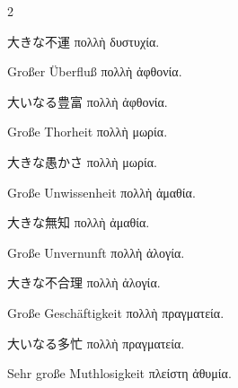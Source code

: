 \begin{paracol}{2}
\begin{enumerate}[leftmargin=0pt,rightmargin=0pt,listparindent =1cm,labelindent=1cm,labelsep=1ex,labelwidth={*},itemindent={*},align=left]
\begin{continuousitemline}
\begin{japanese}
大きな不運 \textgreek[variant=ancient]{πολλὴ δυστυχία.}
\end{japanese}
\switchcolumn*

\begin{german}
Großer Überfluß \textgreek[variant=ancient]{πολλὴ ἀφθονία.}
\end{german}
\switchcolumn

\begin{japanese}
大いなる豊富 \textgreek[variant=ancient]{πολλὴ ἀφθονία.}
\end{japanese}
\switchcolumn*

\begin{german}
Große Thorheit \textgreek[variant=ancient]{πολλὴ μωρία.}
\end{german}
\switchcolumn

\begin{japanese}
大きな愚かさ \textgreek[variant=ancient]{πολλὴ μωρία.}
\end{japanese}
\switchcolumn*

\begin{german}
Große Unwissenheit \textgreek[variant=ancient]{πολλὴ ἀμαθία.}
\end{german}
\switchcolumn

\begin{japanese}
大きな無知 \textgreek[variant=ancient]{πολλὴ ἀμαθία.}
\end{japanese}
\switchcolumn*

\begin{german}
Große Unvernunft \textgreek[variant=ancient]{πολλὴ ἀλογία.}
\end{german}
\switchcolumn

\begin{japanese}
大きな不合理 \textgreek[variant=ancient]{πολλὴ ἀλογία.}
\end{japanese}
\switchcolumn*

\begin{german}
Große Geschäftigkeit \textgreek[variant=ancient]{πολλὴ πραγματεία.}
\end{german}
\switchcolumn

\begin{japanese}
大いなる多忙 \textgreek[variant=ancient]{πολλὴ πραγματεία.}
\end{japanese}
\switchcolumn*

\begin{german}
Sehr große Muthlosigkeit \textgreek[variant=ancient]{πλείστη ἀθυμία.}
\end{german}
\switchcolumn


\end{continuousitemline}
\end{enumerate}
\end{paracol}
